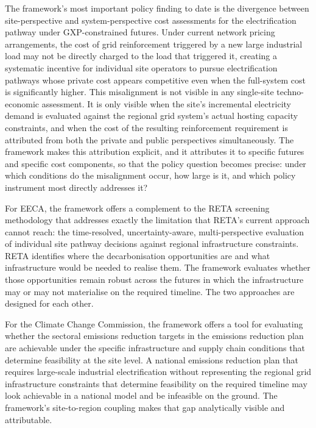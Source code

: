 \documentclass[
  11pt,
  a4paper,
  twoside,
  openright]{scrbook}
\begin{document}
The framework's most important policy finding to date is the divergence
between site-perspective and system-perspective cost assessments for the
electrification pathway under GXP-constrained futures. Under current
network pricing arrangements, the cost of grid reinforcement triggered
by a new large industrial load may not be directly charged to the load
that triggered it, creating a systematic incentive for individual site
operators to pursue electrification pathways whose private cost appears
competitive even when the full-system cost is significantly higher. This
misalignment is not visible in any single-site techno-economic
assessment. It is only visible when the site's incremental electricity
demand is evaluated against the regional grid system's actual hosting
capacity constraints, and when the cost of the resulting reinforcement
requirement is attributed from both the private and public perspectives
simultaneously. The framework makes this attribution explicit, and it
attributes it to specific futures and specific cost components, so that
the policy question becomes precise: under which conditions do the
misalignment occur, how large is it, and which policy instrument most
directly addresses it?

For EECA, the framework offers a complement to the RETA screening
methodology that addresses exactly the limitation that RETA's current
approach cannot reach: the time-resolved, uncertainty-aware,
multi-perspective evaluation of individual site pathway decisions
against regional infrastructure constraints. RETA identifies where the
decarbonisation opportunities are and what infrastructure would be
needed to realise them. The framework evaluates whether those
opportunities remain robust across the futures in which the
infrastructure may or may not materialise on the required timeline. The
two approaches are designed for each other.

For the Climate Change Commission, the framework offers a tool for
evaluating whether the sectoral emissions reduction targets in the
emissions reduction plan are achievable under the specific
infrastructure and supply chain conditions that determine feasibility at
the site level. A national emissions reduction plan that requires
large-scale industrial electrification without representing the regional
grid infrastructure constraints that determine feasibility on the
required timeline may look achievable in a national model and be
infeasible on the ground. The framework's site-to-region coupling makes
that gap analytically visible and attributable.
\end{document}
